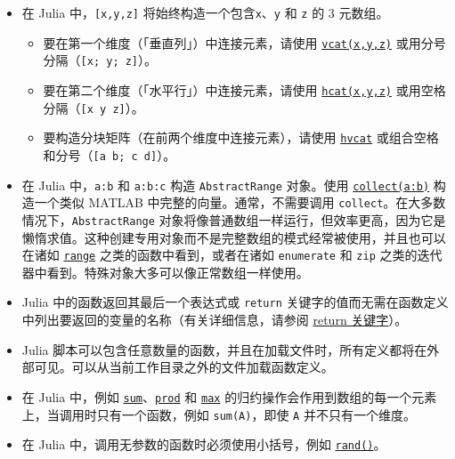 \begin{itemize}
\item 在 Julia 中，\texttt{[x,y,z]} 将始终构造一个包含\texttt{x}、\texttt{y} 和 \texttt{z} 的 3 元数组。

\begin{itemize}
\item 要在第一个维度（「垂直列」）中连接元素，请使用 \hyperlink{14691815416955507876}{\texttt{vcat(x,y,z)}} 或用分号分隔（\texttt{[x; y; z]}）。


\item 要在第二个维度（「水平行」）中连接元素，请使用 \hyperlink{8862791894748483563}{\texttt{hcat(x,y,z)}} 或用空格分隔（\texttt{[x y z]}）。


\item 要构造分块矩阵（在前两个维度中连接元素），请使用 \hyperlink{16279083053557795116}{\texttt{hvcat}} 或组合空格和分号（\texttt{[a b; c d]}）。

\end{itemize}

\item 在 Julia 中，\texttt{a:b} 和 \texttt{a:b:c} 构造 \texttt{AbstractRange} 对象。使用 \hyperlink{6278865767444641812}{\texttt{collect(a:b)}} 构造一个类似 MATLAB 中完整的向量。通常，不需要调用 \texttt{collect}。在大多数情况下，\texttt{AbstractRange} 对象将像普通数组一样运行，但效率更高，因为它是懒惰求值。这种创建专用对象而不是完整数组的模式经常被使用，并且也可以在诸如 \hyperlink{737600656772861535}{\texttt{range}} 之类的函数中看到，或者在诸如 \texttt{enumerate} 和 \texttt{zip} 之类的迭代器中看到。特殊对象大多可以像正常数组一样使用。


\item Julia 中的函数返回其最后一个表达式或 \texttt{return} 关键字的值而无需在函数定义中列出要返回的变量的名称（有关详细信息，请参阅 \hyperlink{16317991580998959177}{return 关键字}）。


\item Julia 脚本可以包含任意数量的函数，并且在加载文件时，所有定义都将在外部可见。可以从当前工作目录之外的文件加载函数定义。


\item 在 Julia 中，例如 \hyperlink{8666686648688281595}{\texttt{sum}}、\hyperlink{13484084847910116333}{\texttt{prod}} 和 \hyperlink{7839419811914289844}{\texttt{max}} 的归约操作会作用到数组的每一个元素上，当调用时只有一个函数，例如 \texttt{sum(A)}，即使 \texttt{A} 并不只有一个维度。


\item 在 Julia 中，调用无参数的函数时必须使用小括号，例如 \hyperlink{7668863842145012694}{\texttt{rand()}}。



\end{itemize}
